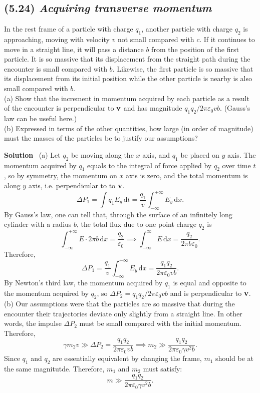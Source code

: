 \documentclass[hidelinks]{article}
\begin{document}
\subsection{(5.24) \textit{Acquiring transverse momentum}}
In the rest frame of a particle with charge $q_1$, another particle with charge $q_2$ is approaching, moving with velocity $v$ not small compared with $c$. If it continues to move in a straight line, it will pass a distance $b$ from the position of the first particle. It is so massive that its displacement from the straight path during the encounter is small compared with $b$. Likewise, the first particle is so massive that its displacement from its initial position while the other particle is nearby is also small compared with $b$.\\[3mm]
(a) Show that the increment in momentum acquired by each particle as a result of the encounter is perpendicular to $\vb{v}$ and has magnitude $q_1 q_2/2\pi \varepsilon_0 vb$. (Gauss’s law can be useful here.)\\
(b) Expressed in terms of the other quantities, how large (in order of magnitude) must the masses of the particles be to justify our assumptions?

\vspace{5mm}
\noindent
\textbf{Solution} \, (a) Let $q_2$ be moving along the $x$ axis, and $q_1$ be placed on $y$ axis. The momentum acquired by $q_1$ equals to the integral of force applied by $q_2$ over time $t$, so by symmetry, the momentum on $x$ axis is zero, and the total momentum is along $y$ axis, i.e. perpendicular to to $\vb{v}$. 
$$\Delta P_1 = \int q_1E_y \, \mathrm{d}t =\frac{q_1}{v} \int_{-\infty}^{+\infty} E_y \, \mathrm{d}x.$$
By Gauss's law, one can tell that, through the surface of an infinitely long cylinder with a radius $b$, the total flux due to one point charge $q_2$ is
$$\int_{-\infty}^{+\infty} E\cdot 2\pi b \, \mathrm{d}x = \frac{q_2}{\varepsilon_0} \implies \int_{-\infty}^{\infty}E\, \mathrm{d}x = \frac{q_2}{2\pi b \varepsilon_0}.$$
Therefore, 
$$\Delta P_1 = \frac{q_1}{v} \int_{-\infty}^{+\infty} E_y \, \mathrm{d}x = \frac{q_1q_2}{2\pi \varepsilon_0 vb}.$$
By Newton’s third law, the momentum acquired by $q_1$ is equal and opposite to
the momentum acquired by $q_2$, so $\Delta P_2 = q_1q_2/2\pi \varepsilon_0 vb$ and is perpendicular to $\vb{v}$. \\[3mm]
(b) Our assumptions were that the particles are so massive that during the encounter their trajectories deviate only slightly from a straight line. In other words, the impulse $\Delta P_2$ must be small compared with the initial momentum. Therefore,
$$\gamma m_2v \gg \Delta P_2 = \frac{q_1q_2}{2\pi \varepsilon_0 v b} \implies m_2 \gg \frac{q_1q_2}{2\pi\varepsilon_0 \gamma v^2 b}.$$
Since $q_1$ and $q_2$ are essentially equivalent by changing the frame, $m_1$ should be at the same magnitutde. Therefore, $m_1$ and $m_2$ must satisfy:
$$m \gg \frac{q_1q_2}{2\pi\varepsilon_0 \gamma v^2 b}.$$
\end{document}
